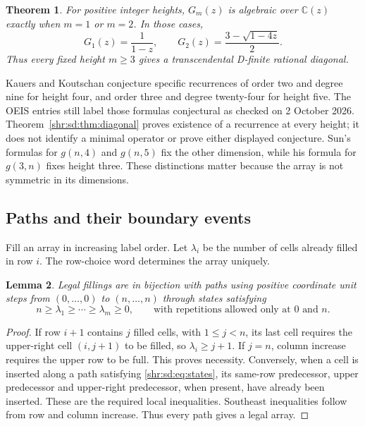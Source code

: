 \documentclass[11pt,letterpaper]{article}
\numberwithin{equation}{section}
\newtheorem{theorem}{Theorem}[section]
\newtheorem{lemma}[theorem]{Lemma}
\theoremstyle{definition}
\newcommand{\1}{\mathbf 1}
\newcommand{\C}{\mathbb C}
\begin{document}
\begin{theorem}\label{shr:sd:thm:trans}
For positive integer heights, $G_m(z)$ is algebraic over $\C(z)$ exactly when $m=1$ or $m=2$. In those cases,
\[
 G_1(z)=\frac1{1-z},\qquad
 G_2(z)=\frac{3-\sqrt{1-4z}}2.
\]
Thus every fixed height $m\ge3$ gives a transcendental D-finite rational diagonal.
\end{theorem}

Kauers and Koutschan \cite[Section 6.4]{KK} conjecture specific recurrences of order two and degree nine for height four, and order three and degree twenty-four for height five. The OEIS entries still label those formulas conjectural as checked on 2 October 2026. Theorem~\ref{shr:sd:thm:diagonal} proves existence of a recurrence at every height; it does not identify a minimal operator or prove either displayed conjecture. Sun's formulas for $g(n,4)$ and $g(n,5)$ fix the other dimension, while his formula for $g(3,n)$ fixes height three. These distinctions matter because the array is not symmetric in its dimensions.

\subsection{Paths and their boundary events}
Fill an array in increasing label order. Let $\lambda_i$ be the number of cells already filled in row $i$. The row-choice word determines the array uniquely.

\begin{lemma}\label{shr:sd:lem:states}
Legal fillings are in bijection with paths using positive coordinate unit steps from $(0,\ldots,0)$ to $(n,\ldots,n)$ through states satisfying
\begin{equation}\label{shr:sd:eq:states}
 n\ge\lambda_1\ge\cdots\ge\lambda_m\ge0,
 \qquad\text{with repetitions allowed only at $0$ and $n$.}
\end{equation}
\end{lemma}
\begin{proof}
If row $i+1$ contains $j$ filled cells, with $1\le j<n$, its last cell requires the upper-right cell $(i,j+1)$ to be filled, so $\lambda_i\ge j+1$. If $j=n$, column increase requires the upper row to be full. This proves necessity. Conversely, when a cell is inserted along a path satisfying \eqref{shr:sd:eq:states}, its same-row predecessor, upper predecessor and upper-right predecessor, when present, have already been inserted. These are the required local inequalities. Southeast inequalities follow from row and column increase. Thus every path gives a legal array.
\end{proof}
\end{document}
